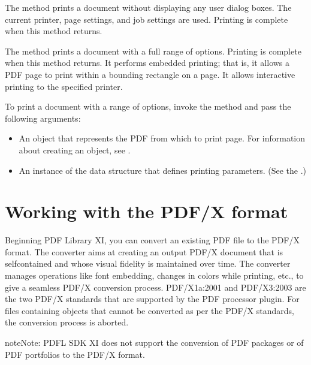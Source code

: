 \documentclass[letterpaper,12pt,english,openany,oneside]{sphinxmanual}
\begin{document}
The  method prints a document without displaying any user dialog boxes. The current printer, page settings, and job settings are used. Printing is complete when this method returns.

The  method prints a document with a full range of options. Printing is complete when this method returns. It performs embedded printing; that is, it allows a PDF page to print within a bounding rectangle on a page. It allows interactive printing to the specified printer.

To print a document with a range of options, invoke the  method and pass the following arguments:
\begin{itemize}
\item {} 
An  object that represents the PDF from which to print page. For information about creating an  object, see .

\item {} 
An instance of the  data structure that defines printing parameters. (See the .)

\end{itemize}


\section{Working with the PDF/X format}
\label{\detokenize{Plugins_Documents:working-with-the-pdf-x-format}}
Beginning PDF Library XI, you can convert an existing PDF file to the PDF/X format. The converter aims at creating an output PDF/X document that is self\sphinxhyphen{}contained and whose visual fidelity is maintained over time. The converter manages operations like font embedding, changes in colors while printing, etc., to give a seamless PDF/X conversion process. PDF/X\sphinxhyphen{}1a:2001 and PDF/X\sphinxhyphen{}3:2003 are the two PDF/X standards that are supported by the PDF processor plugin. For files containing objects that cannot be converted as per the PDF/X standards, the conversion process is aborted.

\begin{sphinxadmonition}{note}{Note:}
PDFL SDK XI does not support the conversion of PDF packages or of PDF portfolios to the PDF/X format.
\end{sphinxadmonition}
\end{document}
